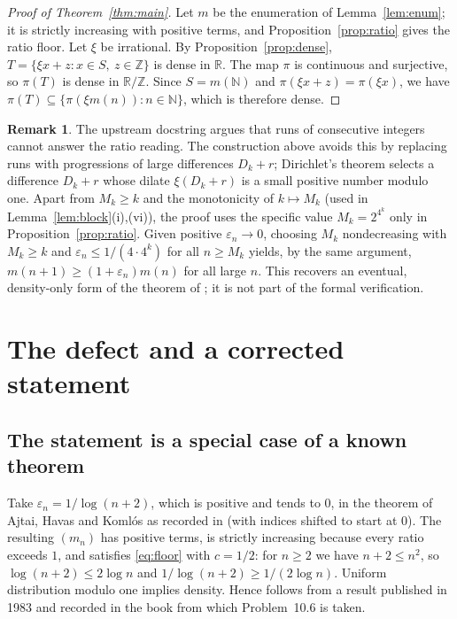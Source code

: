 \documentclass[11pt]{amsart}
\theoremstyle{plain}
\theoremstyle{definition}
\newtheorem{remark}[theorem]{Remark}
\newcommand{\N}{\mathbb{N}}
\newcommand{\R}{\mathbb{R}}
\newcommand{\Z}{\mathbb{Z}}
\begin{document}
\begin{proof}[Proof of Theorem~\ref{thm:main}]
Let $m$ be the enumeration of Lemma~\ref{lem:enum}; it is strictly increasing with positive terms, and Proposition~\ref{prop:ratio} gives the ratio floor.
Let $\xi$ be irrational. By Proposition~\ref{prop:dense}, $T=\{\xi x+z:x\in S,\ z\in\Z\}$ is dense in $\R$. The map $\pi$ is continuous and surjective, so $\pi(T)$ is dense in $\R/\Z$. Since $S=m(\N)$ and $\pi(\xi x+z)=\pi(\xi x)$, we have $\pi(T)\subseteq\{\pi(\xi m(n)):n\in\N\}$, which is therefore dense.
\end{proof}

\begin{remark}\label{rem:general}
The upstream docstring argues that runs of consecutive integers cannot answer the ratio reading. The construction above avoids this by replacing runs with progressions of large differences $D_k+r$; Dirichlet's theorem selects a difference $D_k+r$ whose dilate $\xi(D_k+r)$ is a small positive number modulo one. Apart from $M_k\ge k$ and the monotonicity of $k\mapsto M_k$ (used in Lemma~\ref{lem:block}(i),(vi)), the proof uses the specific value $M_k=2^{4^k}$ only in Proposition~\ref{prop:ratio}. Given positive $\varepsilon_n\to0$, choosing $M_k$ nondecreasing with $M_k\ge k$ and $\varepsilon_n\le1/(4\cdot4^k)$ for all $n\ge M_k$ yields, by the same argument, $m(n+1)\ge(1+\varepsilon_n)m(n)$ for all large $n$. This recovers an eventual, density-only form of the theorem of \cite{AHK83}; it is not part of the formal verification.
\end{remark}

\section{The defect and a corrected statement}\label{sec:defect}

\subsection*{The statement is a special case of a known theorem}
Take $\varepsilon_n=1/\log(n+2)$, which is positive and tends to $0$, in the theorem of Ajtai, Havas and Koml\'os as recorded in \cite[p.~45]{Bug12} (with indices shifted to start at $0$). The resulting $(m_n)$ has positive terms, is strictly increasing because every ratio exceeds $1$, and satisfies \eqref{eq:floor} with $c=1/2$: for $n\ge2$ we have $n+2\le n^2$, so $\log(n+2)\le2\log n$ and $1/\log(n+2)\ge1/(2\log n)$. Uniform distribution modulo one implies density. Hence  follows from a result published in 1983 and recorded in the book from which Problem~10.6 is taken.
\end{document}
